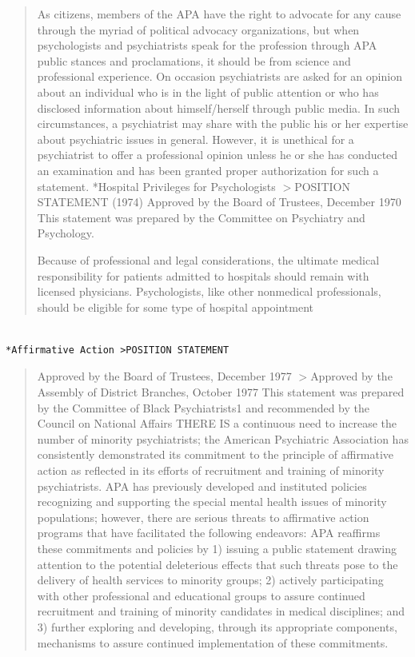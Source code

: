 \begin{quote}

As citizens, members of the APA have the right to advocate for any cause through the myriad of political advocacy organizations, but when psychologists and psychiatrists speak for the profession through APA public stances and proclamations, it should be from science and professional experience.
On occasion psychiatrists are asked for an opinion about an individual who is in the light of public attention or who has disclosed information about himself\slash herself through public media. In such circumstances, a psychiatrist may share with the public his or her expertise about psychiatric issues in general. However, it is unethical for a psychiatrist to offer a professional opinion unless he or she has conducted an examination and has been granted proper authorization for such a statement.
 *Hospital Privileges for Psychologists $>$POSITION STATEMENT (1974)
Approved by the Board of Trustees, December 1970
This statement was prepared by the Committee on Psychiatry and Psychology.

Because of professional and legal considerations, the ultimate medical responsibility for patients admitted to hospitals should remain with licensed physicians. Psychologists, like other nonmedical professionals, should be eligible for some type of hospital appointment
\end{quote}

\begin{adjustwidth}{2.5em}{2.5em}
\begin{verbatim}

*Affirmative Action >POSITION STATEMENT

\end{verbatim}
\end{adjustwidth}

\begin{quote}

Approved by the Board of Trustees, December 1977 $>$Approved by the Assembly of District Branches, October 1977
This statement was prepared by the Committee of Black Psychiatrists1 and recommended by the Council on National Affairs
THERE IS a continuous need to increase the number of minority psychiatrists; the American Psychiatric Association has consistently demonstrated its commitment to the principle of affirmative action as reflected in its efforts of recruitment and training of minority psychiatrists. APA has previously developed and instituted policies recognizing and supporting the special mental health issues of minority populations; however, there are serious threats to affirmative action programs that have facilitated the following endeavors: APA reaffirms these commitments and policies by 1) issuing a public statement drawing attention to the potential deleterious effects that such threats pose to the delivery of health services to minority groups; 2) actively participating with other professional and educational groups to assure continued recruitment and training of minority candidates in medical disciplines; and 3) further exploring and developing, through its appropriate components, mechanisms to assure continued implementation of these commitments. 
\end{quote}

